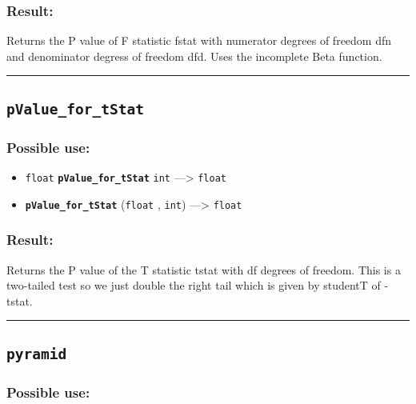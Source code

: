 \documentclass[]{book}
\providecommand{\tightlist}{%
  \setlength{\itemsep}{0pt}\setlength{\parskip}{0pt}}
\theoremstyle{definition}
\theoremstyle{definition}
\theoremstyle{definition}
\theoremstyle{remark}
\begin{document}
\subsubsection{Result:}\label{result-407}

Returns the P value of F statistic fstat with numerator degrees of
freedom dfn and denominator degress of freedom dfd. Uses the incomplete
Beta function.

\begin{center}\rule{0.5\linewidth}{\linethickness}\end{center}

\subsection{\texorpdfstring{\texttt{pValue\_for\_tStat}}{pValue\_for\_tStat}}\label{pvalue_for_tstat}

\subsubsection{Possible use:}\label{possible-use-422}

\begin{itemize}
\tightlist
\item
  \texttt{float} \textbf{\texttt{pValue\_for\_tStat}} \texttt{int}
  ---\textgreater{} \texttt{float}
\item
  \textbf{\texttt{pValue\_for\_tStat}} (\texttt{float} , \texttt{int})
  ---\textgreater{} \texttt{float}
\end{itemize}

\subsubsection{Result:}\label{result-408}

Returns the P value of the T statistic tstat with df degrees of freedom.
This is a two-tailed test so we just double the right tail which is
given by studentT of -\textbar{}tstat\textbar{}.

\begin{center}\rule{0.5\linewidth}{\linethickness}\end{center}

\subsection{\texorpdfstring{\texttt{pyramid}}{pyramid}}\label{pyramid}

\subsubsection{Possible use:}\label{possible-use-423}
\end{document}

